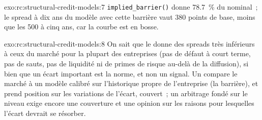 \begin{solution}{exo:rc:structural-credit-models:7}
\texttt{implied\_barrier()} donne 78.7~\% du nominal~; le spread à dix ans du modèle avec cette
barrière vaut 380 points de base, moins que les 500 à cinq ans, car la courbe est en bosse.
\end{solution}

\begin{solution}{exo:rc:structural-credit-models:8}
On sait que le  donne des spreads très inférieurs à ceux du marché pour la plupart des entreprises (pas de
défaut à court terme, pas de sauts, pas de liquidité ni de primes de risque au-delà de la diffusion), si bien que
un écart important est la norme, et non un signal. Un  compare le marché à un
modèle calibré sur l'historique propre de l'entreprise (la barrière), et prend position sur les variations de l'écart,
couvert~; un arbitrage fondé sur le niveau exige encore une couverture et une opinion sur les raisons pour lesquelles l'écart
devrait se résorber.
\end{solution}

